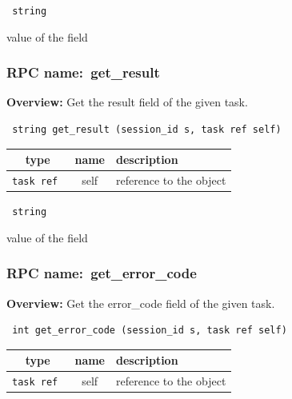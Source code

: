\vspace{0.3cm}

{\tt 
string
}


value of the field
\vspace{0.3cm}
\vspace{0.3cm}
\vspace{0.3cm}
\subsubsection{RPC name:~get\_result}

{\bf Overview:} 
Get the result field of the given task.

\begin{verbatim} string get_result (session_id s, task ref self)\end{verbatim}



 
\vspace{0.3cm}
\begin{tabular}{|c|c|p{7cm}|}
 \hline
{\bf type} & {\bf name} & {\bf description} \\ \hline
{\tt task ref } & self & reference to the object \\ \hline 

\end{tabular}

\vspace{0.3cm}

{\tt 
string
}


value of the field
\vspace{0.3cm}
\vspace{0.3cm}
\vspace{0.3cm}
\subsubsection{RPC name:~get\_error\_code}

{\bf Overview:} 
Get the error\_code field of the given task.

\begin{verbatim} int get_error_code (session_id s, task ref self)\end{verbatim}



 
\vspace{0.3cm}
\begin{tabular}{|c|c|p{7cm}|}
 \hline
{\bf type} & {\bf name} & {\bf description} \\ \hline
{\tt task ref } & self & reference to the object \\ \hline 

\end{tabular}

